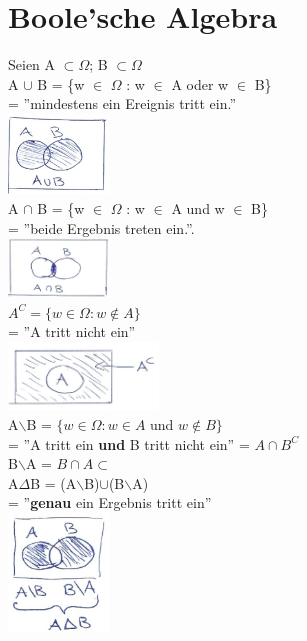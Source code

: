 \section{Boole'sche Algebra}
Seien A $\subset \Omega$; B $\subset \Omega$\\
A $\cup$ B = \{w $\in$ $\Omega$ : w $\in$ A oder w $\in$ B\}\\
= ''mindestens ein Ereignis tritt ein.''\\\includegraphics[width=0.2\textwidth]{img/ver.PNG}\medskip\\
A $\cap$ B = \{w $\in$ $\Omega$ : w $\in$ A und w $\in$ B\}\\
= ''beide Ergebnis treten ein.''.\\\includegraphics[width=0.2\textwidth]{img/schnitt.PNG}\medskip\\
$A^C =\{ w \in \Omega : w \notin A\}$\\
= ''A tritt nicht ein''\\\includegraphics[width=0.3\textwidth]{img/komplement.PNG}\medskip\\
A$\backslash$B = $\{w \in \Omega : w \in A $ und $w \notin B\}$\\
= ''A tritt ein \textbf{und} B tritt nicht ein'' = $A\cap B^C$\medskip\\
B$\backslash$A = $B\cap A \subset$\\
A$\Delta$B = (A$\backslash$B)$\cup$(B$\backslash$A)\\
= ''\textbf{genau} ein Ergebnis tritt ein''\\\includegraphics[width=0.2\textwidth]{img/genau1.PNG}\medskip\\

